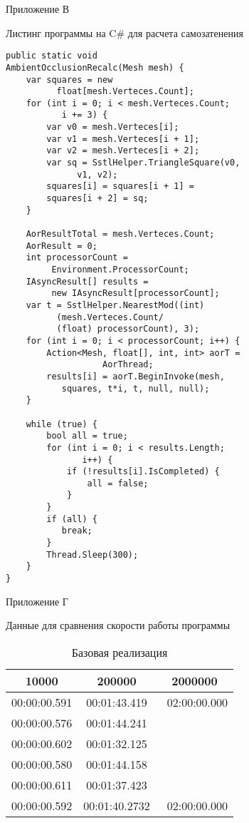 \clearpage
{}
\begin{flushright}\Large{Приложение В}\end{flushright}
\begin{center}\large{Листинг программы на C\# для расчета самозатенения}\end{center}
\begin{lstlisting}
public static void 
AmbientOcclusionRecalc(Mesh mesh) {
    var squares = new 
          float[mesh.Verteces.Count];
    for (int i = 0; i < mesh.Verteces.Count; 
           i += 3) {
        var v0 = mesh.Verteces[i];
        var v1 = mesh.Verteces[i + 1];
        var v2 = mesh.Verteces[i + 2];
        var sq = SstlHelper.TriangleSquare(v0, 
              v1, v2);
        squares[i] = squares[i + 1] = 
        squares[i + 2] = sq;
    }

    AorResultTotal = mesh.Verteces.Count;
    AorResult = 0;
    int processorCount = 
         Environment.ProcessorCount;
    IAsyncResult[] results = 
         new IAsyncResult[processorCount];
    var t = SstlHelper.NearestMod((int) 
          (mesh.Verteces.Count/
          (float) processorCount), 3);
    for (int i = 0; i < processorCount; i++) {
        Action<Mesh, float[], int, int> aorT = 
                   AorThread;
        results[i] = aorT.BeginInvoke(mesh, 
           squares, t*i, t, null, null);
    }

    while (true) {
        bool all = true;
        for (int i = 0; i < results.Length; 
               i++) {
            if (!results[i].IsCompleted) {
                all = false;
            }
        }
        if (all) {
           break;
        }
        Thread.Sleep(300);
    }
}
\end{lstlisting}

\clearpage
{}
\begin{flushright}\Large{Приложение Г}\end{flushright}
\begin{center}\large{Данные для сравнения скорости работы программы}\end{center}


\begin{table}[h]
\caption{Базовая реализация}
\begin{tabular}{|c|c|c|}
\hline
10000 & 200000 & 2000000 \\
\hline
00:00:00.591 & 00:01:43.419 & ~02:00:00.000 \\
00:00:00.576  & 00:01:44.241 & \\
00:00:00.602  & 00:01:32.125 & \\
00:00:00.580  & 00:01:44.158 & \\
00:00:00.611  & 00:01:37.423 & \\
00:00:00.592  & 00:01:40.2732 & ~02:00:00.000 \\
\hline
\end{tabular}
\end{table}

